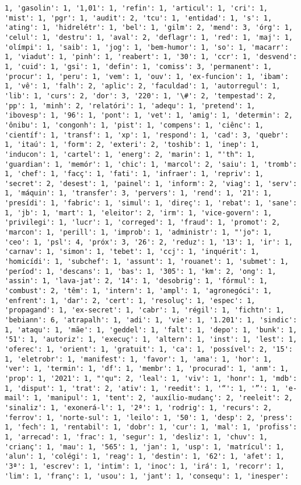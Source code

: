 \documentclass[11pt]{article}
\begin{document}
\begin{Verbatim}[commandchars=\\\{\}]
1, 'gasolin': 1, '1,01': 1, 'refin': 1, 'articul': 1, 'cri': 1, 'mist': 1, 'pgr': 1, 'audit': 2, 'tcu': 1, 'entidad': 1, 's': 1, 'ating': 1, 'hidrelétr': 1, 'bel': 1, 'gilm': 2, 'mend': 3, 'órg': 1, 'celul': 1, 'destru': 1, 'aval': 2, 'deflagr': 1, 'red': 1, 'maj': 1, 'olímpi': 1, 'saib': 1, 'jog': 1, 'bem-humor': 1, 'so': 1, 'macarr': 1, 'viadut': 1, 'pinh': 1, 'reabert': 1, '30': 1, 'ccr': 1, 'desvend': 1, 'cuid': 1, 'gsi': 1, 'defin': 1, 'comiss': 3, 'permanent': 1, 'procur': 1, 'peru': 1, 'vem': 1, 'ouv': 1, 'ex-funcion': 1, 'ibam': 1, 'vê': 1, 'falh': 2, 'aplic': 2, 'faculdad': 1, 'autorregul': 1, 'lib': 1, 'curs': 2, 'dor': 3, '220': 1, '\#': 2, 'tempestad': 2, 'pp': 1, 'minh': 2, 'relatóri': 1, 'adequ': 1, 'pretend': 1, 'ibovesp': 1, '96': 1, 'pont': 1, 'vet': 1, 'amig': 1, 'determin': 2, 'ônibu': 1, 'congonh': 1, 'pist': 1, 'compens': 1, 'ciênc': 1, 'científ': 1, 'transf': 1, 'xp': 1, 'respond': 1, 'cad': 3, 'quebr': 1, 'itaú': 1, 'form': 2, 'exteri': 2, 'toshib': 1, 'inep': 1, 'inducon': 1, 'cartel': 1, 'energ': 2, 'marin': 1, "'th": 1, 'guardian': 1, 'memór': 1, 'chic': 1, 'marcol': 2, 'saiu': 1, 'tromb': 1, 'chef': 1, 'facç': 1, 'fati': 1, 'infraer': 1, 'repriv': 1, 'secret': 2, 'desest': 1, 'painel': 1, 'inform': 2, 'viag': 1, 'serv': 1, 'máquin': 1, 'transfer': 3, 'pervers': 1, 'rend': 1, '21': 1, 'presídi': 1, 'fabric': 1, 'simul': 1, 'direç': 1, 'rebat': 1, 'sane': 1, 'jb': 1, 'mart': 1, 'eleitor': 2, 'irm': 1, 'vice-govern': 1, 'privilegi': 1, 'lucr': 1, 'correged': 1, 'fraud': 1, 'promot': 2, 'marcon': 1, 'perill': 1, 'improb': 1, 'administr': 1, "'jo": 1, 'ceo': 1, 'psl': 4, 'próx': 3, '26': 2, 'reduz': 1, '13': 1, 'ir': 1, 'carnav': 1, 'simon': 1, 'tebet': 1, 'ccj': 1, 'inquérit': 1, 'homicídi': 1, 'subchef': 1, 'assunt': 1, 'rouanet': 1, 'submet': 1, 'períod': 1, 'descans': 1, 'bas': 1, '305': 1, 'km': 2, 'ong': 1, 'assin': 1, 'lava-jat': 2, '14': 1, 'desobrig': 1, 'fórmul': 1, 'combust': 2, 'têm': 1, 'intern': 1, 'ampl': 1, 'agronegóci': 1, 'enfrent': 1, 'dar': 2, 'cert': 1, 'resoluç': 1, 'espec': 1, 'propagand': 1, 'ex-secret': 1, 'cabr': 1, 'régil': 1, 'fichtn': 1, 'bebiann': 6, 'atrapalh': 1, 'adi': 1, 'vie': 1, '1.201': 1, 'sindic': 1, 'ataqu': 1, 'mãe': 1, 'geddel': 1, 'falt': 1, 'depo': 1, 'bunk': 1, '51': 1, 'autoriz': 1, 'execuç': 1, 'altern': 1, 'inst': 1, 'lest': 1, 'oferec': 1, 'orient': 1, 'gratuit': 1, 'ca': 1, 'possível': 2, '15': 1, 'eletrobr': 1, 'manifest': 1, 'favor': 1, 'ama': 1, 'hor': 1, 'ver': 1, 'termin': 1, 'df': 1, 'membr': 1, 'procurad': 1, 'anm': 1, 'prop': 1, '2021': 1, "'qu": 2, 'leal': 1, 'viv': 1, 'honr': 1, 'mdb': 1, 'disput': 1, 'trat': 2, 'ativ': 1, 'reedit': 1, '“': 1, '”': 1, 'e-mail': 1, 'manipul': 1, 'tent': 2, 'auxílio-mudanç': 2, 'reeleit': 2, 'sinaliz': 1, 'exonerá-l': 1, '2ª': 1, 'rodrig': 1, 'recurs': 2, 'ferrov': 1, 'norte-sul': 1, 'leilo': 1, '50': 1, 'desp': 2, 'press': 1, 'fech': 1, 'rentabil': 1, 'dobr': 1, 'cur': 1, 'mal': 1, 'profiss': 1, 'arrecad': 1, 'frac': 1, 'segur': 1, 'desliz': 1, 'chuv': 1, 'crianç': 1, 'mau': 1, '565': 1, 'jan': 1, 'usp': 1, 'matrícul': 1, 'alun': 1, 'colégi': 1, 'reag': 1, 'destin': 1, '62': 1, 'afet': 1, '3ª': 1, 'escrev': 1, 'intim': 1, 'inoc': 1, 'irá': 1, 'recorr': 1, 'lim': 1, 'franç': 1, 'usou': 1, 'jant': 1, 'consequ': 1, 'inesper': 
\end{Verbatim}
\end{document}
